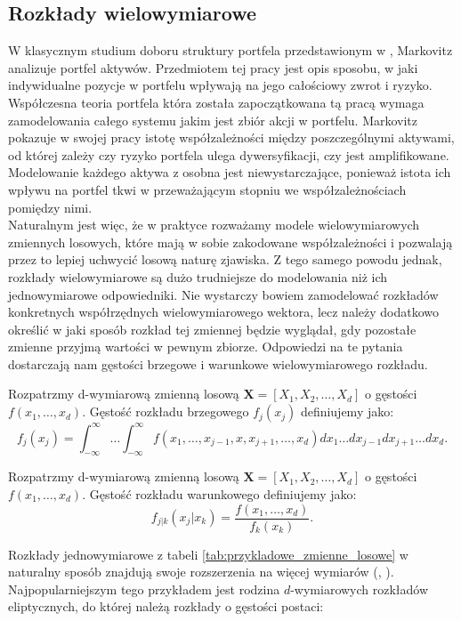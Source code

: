 \subsection{Rozkłady wielowymiarowe}

W klasycznym studium doboru struktury portfela przedstawionym w \cite{Markovitz_MPT}, Markovitz analizuje portfel aktywów. Przedmiotem tej pracy jest opis sposobu, w jaki indywidualne pozycje w portfelu wpływają na jego całościowy zwrot i ryzyko. Współczesna teoria portfela która została zapoczątkowana tą pracą wymaga zamodelowania całego systemu jakim jest zbiór akcji w portfelu. Markovitz pokazuje w swojej pracy istotę współzależności między poszczególnymi aktywami, od której zależy czy ryzyko portfela ulega dywersyfikacji, czy jest amplifikowane. Modelowanie każdego aktywa z osobna jest niewystarczające, ponieważ istota ich wpływu na portfel tkwi w przeważającym stopniu we współzależnościach pomiędzy nimi.\\
Naturalnym jest więc, że w praktyce rozważamy modele wielowymiarowych zmiennych losowych, które mają w sobie zakodowane współzależności i pozwalają przez to lepiej uchwycić losową naturę zjawiska. Z tego samego powodu jednak, rozkłady wielowymiarowe są dużo trudniejsze do modelowania niż ich jednowymiarowe odpowiedniki. Nie wystarczy bowiem zamodelować rozkładów konkretnych współrzędnych wielowymiarowego wektora, lecz należy dodatkowo określić w jaki sposób rozkład tej zmiennej będzie wyglądał, gdy pozostałe zmienne przyjmą wartości w pewnym zbiorze. Odpowiedzi na te pytania dostarczają nam gęstości brzegowe i warunkowe wielowymiarowego rozkładu.
\begin{df}
	Rozpatrzmy d-wymiarową zmienną losową $\mathbf{X} = [X_1, X_2, \dots, X_d]$ o gęstości $f(x_1, \dots, x_d)$. Gęstość rozkładu brzegowego $f_{j}(x_j)$ definiujemy jako:
	$$f_j(x_j)=\int_{-\infty}^{\infty}\dots\int_{-\infty}^{\infty} f(x_1, \dots, x_{j-1}, x, x_{j+1}, \dots, x_d)  dx_1\dots dx_{j-1} dx_{j+1} \dots dx_d.$$
\end{df}

\begin{df}
	Rozpatrzmy d-wymiarową zmienną losową $\mathbf{X} = [X_1, X_2, \dots, X_d]$ o gęstości $f(x_1, \dots, x_d)$. Gęstość rozkładu warunkowego definiujemy jako:
	 $$f_{j|k}(x_j|x_k) = \frac{f(x_1, \dots, x_d)}{f_k(x_k)}.$$
\end{df}

Rozkłady jednowymiarowe z tabeli \ref{tab:przykladowe_zmienne_losowe} w naturalny sposób znajdują swoje rozszerzenia na więcej wymiarów (\cite{MultivariateDistributions}, \cite{Cherubini_Copula_Methods_in_Finance}). Najpopularniejszym tego przykładem jest rodzina $d$-wymiarowych rozkładów eliptycznych, do której należą rozkłady o gęstości postaci:

